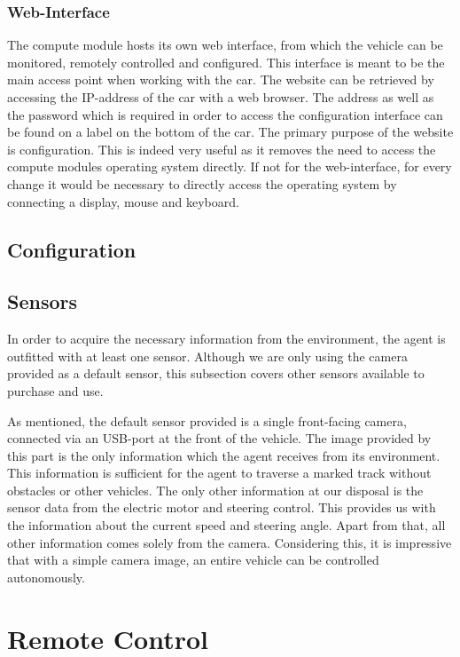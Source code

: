 \subsubsection{Web-Interface}
The compute module hosts its own web interface, from which the vehicle can be monitored, remotely controlled and configured. This interface is meant to be the main access point when working with the car. The website can be retrieved by accessing the IP-address of the car with a web browser. The address as well as the password which is required in order to access the configuration interface can be found on a label on the bottom of the car. The primary purpose of the website is configuration. This is indeed very useful as it removes the need to access the compute modules operating system directly. If not for the web-interface, for every change it would be necessary to directly access the operating system by connecting a display, mouse and keyboard.

\subsection{Configuration}

\subsection{Sensors}
In order to acquire the necessary information from the environment, the agent is outfitted with at least one sensor. Although we are only using the camera provided as a default sensor, this subsection covers other sensors available to purchase and use.

As mentioned, the default sensor provided is a single front-facing camera, connected via an USB-port at the front of the vehicle. The image provided by this part is the only information which the agent receives from its environment. This information is sufficient for the agent to traverse a marked track without obstacles or other vehicles. The only other information at our disposal is the sensor data from the electric motor and steering control. This provides us with the information about the current speed and steering angle. Apart from that, all other information comes solely from the camera. Considering this, it is impressive that with a simple camera image, an entire vehicle can be controlled autonomously.

\section{Remote Control}


